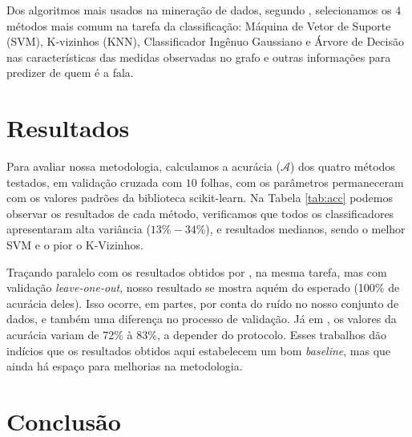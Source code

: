 \documentclass[11pt]{article}
\begin{document}
Dos algoritmos mais usados na mineração de dados, segundo \cite{top10}, selecionamos os $4$ métodos mais comum na tarefa da classificação: Máquina de Vetor de Suporte (SVM), K-vizinhos (KNN), Classificador Ingênuo Gaussiano e Árvore de Decisão nas características das medidas observadas no grafo e outras informações para predizer de quem é a fala. 

\section{Resultados}\label{sec:resu}

Para avaliar nossa metodologia, calculamos a acurácia ($\mathcal{A}$) dos quatro métodos testados, em validação cruzada com $10$ folhas, com os parâmetros permaneceram com os valores padrões da biblioteca scikit-learn. Na Tabela \ref{tab:acc} podemos observar os resultados de cada método, verificamos que todos os classificadores apresentaram alta variância ($13\% - 34\%$), e resultados medianos, sendo o melhor SVM e o pior o K-Vizinhos.


\begin{table}[!ht]
\centering
{}
\caption{Média e Incerteza da Acurácia obtida.}%
\label{tab:acc}
\end{table}

Traçando paralelo com os resultados obtidos por \cite{bedi2015automated}, na mesma tarefa, mas com validação \textit{leave-one-out}, nosso resultado se mostra aquém do esperado (100\% de acurácia deles). Isso ocorre, em partes, por conta do ruído no nosso conjunto de dados, e também uma diferença no processo de validação. Já em \cite{Corcoran:2018}, os valores da acurácia variam de 72\% à 83\%, a depender do protocolo. Esses trabalhos dão indícios que os resultados obtidos aqui estabelecem um bom \textit{baseline}, mas que ainda há espaço para melhorias na metodologia.


\section{Conclusão}\label{sec:conc}
\end{document}
